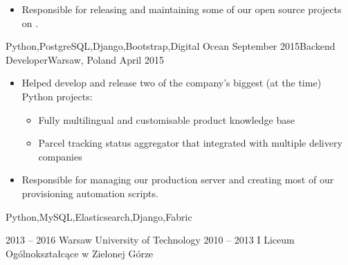 \documentclass[localFont,alternative,10pt]{yaac-another-awesome-cv}
\begin{document}
\begin{experiences}
{\begin{itemize}
\begin{itemize}
                              \item Schedoodle, an internal tool that helped track availability of all employees
                              \item Official Polish site for Kolbe personality tests
                              \item Canola trading platform made for one of the biggest Polish oil distributors
                            \end{itemize}
                          \item Responsible for releasing and maintaining some of our open source projects on .
                        \end{itemize}
                      }
                      {Python,PostgreSQL,Django,Bootstrap,Digital Ocean}
    \emptySeparator
    \experience
      {September 2015}{Backend Developer}{}{Warsaw, Poland}
      {April 2015}    {
                        \begin{itemize}
                          \item Helped develop and release two of the company's biggest (at the time) Python projects:
                            \begin{itemize}
                              \item Fully multilingual and customisable product knowledge base
                              \item Parcel tracking status aggregator that integrated with multiple delivery companies
                            \end{itemize}
                          \item Responsible for managing our production server and creating most of our provisioning automation scripts.
                        \end{itemize}
                      }
                      {Python,MySQL,Elasticsearch,Django,Fabric}
  \end{experiences}


  \begin{scholarship}
    \scholarshipentry
      {2013 – 2016}
      {Warsaw University of Technology}
    \scholarshipentry
      {2010 – 2013}
      {I Liceum Ogólnokształcące w Zielonej Górze}
  \end{scholarship}
\end{document}
